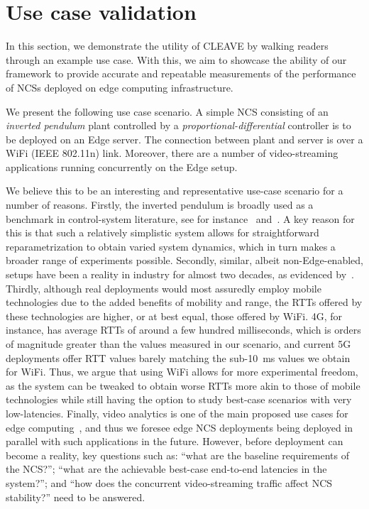 \section{Use case validation}\label{paper:olguinmunoz2022cleave:experiments}

In this section, we demonstrate the utility of \gls{CLEAVE} by walking readers through an example use case.
With this, we aim to showcase the ability of our framework to provide accurate and repeatable measurements of the performance of \glspl{NCS} deployed on edge computing infrastructure.

We present the following use case scenario.
A simple \gls{NCS} consisting of an \emph{inverted pendulum} plant controlled by a \emph{proportional-differential} controller is to be deployed on an Edge server.
The connection between plant and server is over a WiFi (IEEE 802.11n) link.
Moreover, there are a number of video-streaming applications running concurrently on the Edge setup.

We believe this to be an interesting and representative use-case scenario for a number of reasons.
Firstly, the inverted pendulum is broadly used as a benchmark in control-system literature, see for instance\ \cite{baumann2018evaluating} and\ \cite{natale2004inverted}.
A key reason for this is that such a relatively simplistic system allows for straightforward reparametrization to obtain varied system dynamics, which in turn makes a broader range of experiments possible.
Secondly, similar, albeit non-Edge-enabled, setups have been a reality in industry for almost two decades, as evidenced by\ \cite{gupta2010networked}.
Thirdly, although real deployments would most assuredly employ mobile technologies due to the added benefits of mobility and range, the \glspl{RTT} offered by these technologies are higher, or at best equal, those offered by WiFi.
4G, for instance, has average \glspl{RTT} of around a few hundred milliseconds, which is orders of magnitude greater than the values measured in our scenario, and current 5G deployments offer \gls{RTT} values barely matching the sub-\SI{10}{\milli\second} values we obtain for WiFi.
Thus, we argue that using WiFi allows for more experimental freedom, as the system can be tweaked to obtain worse \glspl{RTT} more akin to those of mobile technologies while still having the option to study best-case scenarios with very low-latencies.
Finally, video analytics is one of the main proposed use cases for edge computing~\cite{ananthanarayanan2017real,yi2017lavea,wang2018bandwidth}, and thus we foresee edge \gls{NCS} deployments being deployed in parallel with such applications in the future.
However, before deployment can become a reality, key questions such as: 
``what are the baseline requirements of the \gls{NCS}?'';
``what are the achievable best-case end-to-end latencies in the system?'';
and ``how does the concurrent video-streaming traffic affect \gls{NCS} stability?'' need to be answered.

